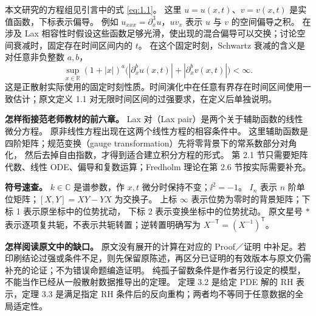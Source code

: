 本文研究的方程组见引言中的式 \eqref{eq:1.1}。
这里 $u=u(x,t)$、$v=v(x,t)$ 是实值函数，下标表示偏导。
例如 $u_{xxx}=\partial_x^3u$，$uv_x$ 表示 $u$ 与 $v$ 的空间偏导之积。
在涉及 Lax 相容性时假设这些函数足够光滑，使出现的混合偏导可以交换；讨论空间衰减时，固定存在时间区间内的 $t$。
在这个固定时刻，Schwartz 衰减的含义是对任意非负整数 $a,b$，
\[
\sup_{x\in\mathbb R}(1+|x|)^a
\bigl(|\partial_x^bu(x,t)|+|\partial_x^bv(x,t)|\bigr)<\infty.
\]
这是正散射实际使用的固定时刻性质。时间演化中在任意有界存在时间区间使用一致估计；原文定义 1.1 对无限时间区间的过强要求，在定义后单独说明。

\begin{note}
  \textbf{怎样衔接范老师教材的前六章。}
  Lax 对（Lax pair）是两个关于辅助函数的线性微分方程。
  原非线性方程出现在这两个线性方程的相容条件中。
  这里辅助函数是四阶矩阵；规范变换（gauge transformation）先将零背景下的常系数部分对角化，
  然后去掉自由指数，才得到适合建立积分方程的形式。
  第 2.1 节只需要矩阵代数、线性 ODE、偏导和复数运算；Fredholm 理论在第 2.6 节按实际需要补充。
\end{note}

\begin{note}
  \textbf{符号速查。}
  $k\in\mathbb C$ 是谱参数，作 $x,t$ 微分时保持不变；$\ii^2=-1$。
  $I_n$ 表示 $n$ 阶单位矩阵；$[X,Y]=XY-YX$ 为交换子。
  上标 $\infty$ 表示位势为零时的背景矩阵；下标 1 表示原坐标中的位势扰动，
  下标 2 表示变换坐标中的位势扰动。
  原文星号 $*$ 表示逐项复共轭，不表示共轭转置；逆转置明确写为 $X^{-\mathsf T}=(X^{-1})^{\mathsf T}$。
\end{note}
\begin{note}
  \textbf{怎样阅读原文中的缺口。}
  原文没有展开的计算在对应的 Proof／证明 中补足。若印刷结论过强或条件不足，则先保留原陈述，再区分已证明的有效版本与原文仍需补充的论证；不为错误命题编造证明。
  纯孤子留数条件是作者另行设定的模型，不能当作已经从一般散射数据推导出的定理。
  定理 3.2 是给定 PDE 解的 RH 表示，定理 3.3 是满足指定 RH 条件后的反向重构；两者均不等同于任意数据的全局适定性。
\end{note}
